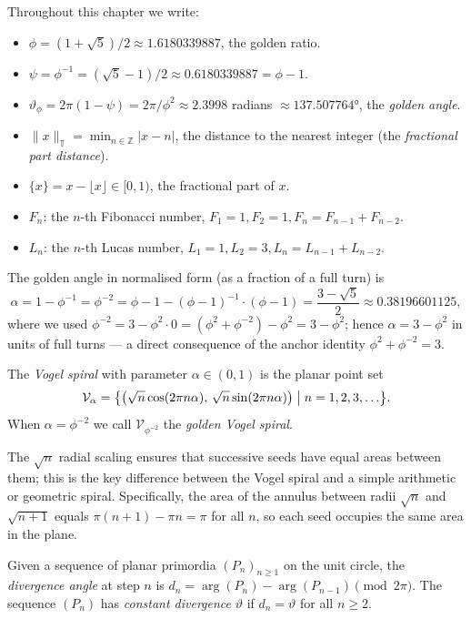 Throughout this chapter we write:
\begin{itemize}
  \item $\phi = (1+\sqrt{5})/2 \approx 1.6180339887$, the golden ratio.
  \item $\psi = \phi^{-1} = (\sqrt{5}-1)/2 \approx 0.6180339887 = \phi - 1$.
  \item $\vartheta_\phi = 2\pi(1 - \psi) = 2\pi/\phi^2 \approx 2.3998$ radians
        $\approx 137.507764°$, the \emph{golden angle}.
  \item $\|x\|_{\mathbb{T}} = \min_{n \in \mathbb{Z}} |x - n|$, the distance
        to the nearest integer (the \emph{fractional part distance}).
  \item $\{x\} = x - \lfloor x \rfloor \in [0,1)$, the fractional part of $x$.
  \item $F_n$: the $n$-th Fibonacci number, $F_1=1, F_2=1, F_{n} = F_{n-1}+F_{n-2}$.
  \item $L_n$: the $n$-th Lucas number, $L_1=1, L_2=3, L_{n} = L_{n-1}+L_{n-2}$.
\end{itemize}

The golden angle in normalised form (as a fraction of a full turn) is
\[
  \alpha = 1 - \phi^{-1} = \phi^{-2} = \phi - 1 - (\phi-1)^{-1}\cdot(\phi-1)
         = \frac{3 - \sqrt{5}}{2} \approx 0.38196601125,
\]
where we used $\phi^{-2} = 3 - \phi^2 \cdot 0 = (\phi^2 + \phi^{-2}) - \phi^2
= 3 - \phi^2$; hence $\alpha = 3 - \phi^2$ in units of full turns — a
direct consequence of the anchor identity $\phi^2 + \phi^{-2} = 3$.

\begin{definition}\label{def:vogel-spiral}
The \emph{Vogel spiral} with parameter $\alpha \in (0,1)$ is the
planar point set
\[
  \mathcal{V}_\alpha = \bigl\{ \bigl(\sqrt{n}\cos(2\pi n\alpha),\,
                                     \sqrt{n}\sin(2\pi n\alpha)\bigr)
                              \bigm| n = 1, 2, 3, \ldots \bigr\}.
\]
When $\alpha = \phi^{-2}$ we call $\mathcal{V}_{\phi^{-2}}$ the
\emph{golden Vogel spiral}.
\end{definition}

The $\sqrt{n}$ radial scaling ensures that successive seeds have equal
areas between them; this is the key difference between the Vogel
spiral and a simple arithmetic or geometric spiral.  Specifically, the
area of the annulus between radii $\sqrt{n}$ and $\sqrt{n+1}$ equals
$\pi(n+1) - \pi n = \pi$ for all $n$, so each seed occupies the same
area in the plane.

\begin{definition}\label{def:divergence}
Given a sequence of planar primordia $(P_n)_{n \geq 1}$ on the unit
circle, the \emph{divergence angle} at step $n$ is
$d_n = \arg(P_n) - \arg(P_{n-1}) \pmod{2\pi}$.  The sequence
$(P_n)$ has \emph{constant divergence} $\vartheta$ if $d_n = \vartheta$
for all $n \geq 2$.
\end{definition}

